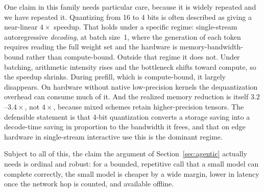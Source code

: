One claim in this family needs particular care, because it is widely repeated and
we have repeated it. Quantizing from 16 to 4 bits is often described as giving a
near-linear $4\times$ speedup. That holds under a specific regime: single-stream
autoregressive \emph{decoding}, at batch size~1, where the generation of each
token requires reading the full weight set and the hardware is
memory-bandwidth-bound rather than compute-bound. Outside that regime it does
not. Under batching, arithmetic intensity rises and the bottleneck shifts toward
compute, so the speedup shrinks. During prefill, which is compute-bound, it
largely disappears. On hardware without native low-precision kernels the
dequantization overhead can consume much of it. And the realized memory reduction
is itself $3.2$--$3.4\times$, not $4\times$, because mixed schemes retain
higher-precision tensors. The defensible statement is that 4-bit quantization
converts a storage saving into a decode-time saving in proportion to the
bandwidth it frees, and that on edge hardware in single-stream interactive use
this is the dominant regime.

Subject to all of this, the claim the argument of Section~\ref{sec:agentic}
actually needs is ordinal and robust: for a bounded, repetitive call that a small
model can complete correctly, the small model is cheaper by a wide margin, lower
in latency once the network hop is counted, and available offline.
